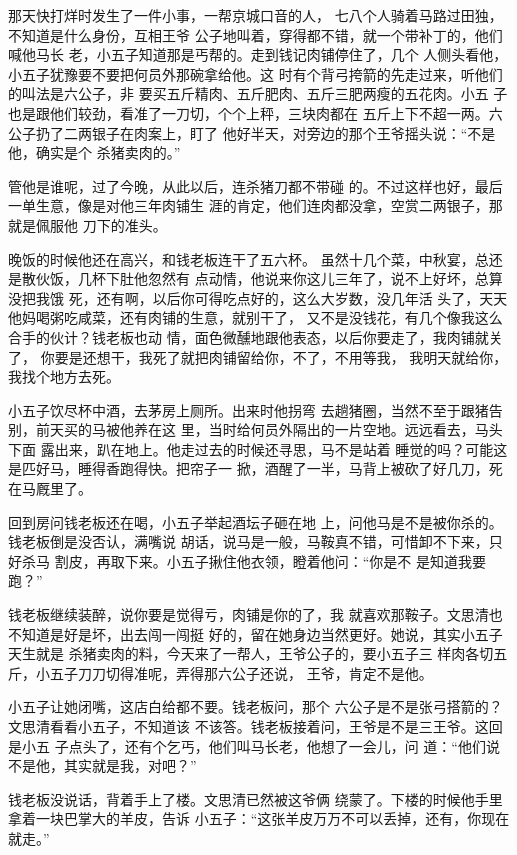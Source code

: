 那天快打烊时发生了一件小事，一帮京城口音的人，
七八个人骑着马路过田独，不知道是什么身份，互相王爷
公子地叫着，穿得都不错，就一个带补丁的，他们喊他马长
老，小五子知道那是丐帮的。走到钱记肉铺停住了，几个
人侧头看他，小五子犹豫要不要把何员外那碗拿给他。这
时有个背弓挎箭的先走过来，听他们的叫法是六公子，非
要买五斤精肉、五斤肥肉、五斤三肥两瘦的五花肉。小五
子也是跟他们较劲，看准了一刀切，个个上秤，三块肉都在
五斤上下不超一两。六公子扔了二两银子在肉案上，盯了
他好半天，对旁边的那个王爷摇头说：“不是他，确实是个
杀猪卖肉的。”

管他是谁呢，过了今晚，从此以后，连杀猪刀都不带碰
的。不过这样也好，最后一单生意，像是对他三年肉铺生
涯的肯定，他们连肉都没拿，空赏二两银子，那就是佩服他
刀下的准头。

晚饭的时候他还在高兴，和钱老板连干了五六杯。
虽然十几个菜，中秋宴，总还是散伙饭，几杯下肚他忽然有
点动情，他说来你这儿三年了，说不上好坏，总算没把我饿
死，还有啊，以后你可得吃点好的，这么大岁数，没几年活
头了，天天他妈喝粥吃咸菜，还有肉铺的生意，就别干了，
又不是没钱花，有几个像我这么合手的伙计？钱老板也动
情，面色微醺地跟他表态，以后你要走了，我肉铺就关了，
你要是还想干，我死了就把肉铺留给你，不了，不用等我，
我明天就给你，我找个地方去死。

小五子饮尽杯中酒，去茅房上厕所。出来时他拐弯
去趟猪圈，当然不至于跟猪告别，前天买的马被他养在这
里，当时给何员外隔出的一片空地。远远看去，马头下面
露出来，趴在地上。他走过去的时候还寻思，马不是站着
睡觉的吗？可能这是匹好马，睡得香跑得快。把帘子一
掀，酒醒了一半，马背上被砍了好几刀，死在马厩里了。

回到房问钱老板还在喝，小五子举起酒坛子砸在地
上，问他马是不是被你杀的。钱老板倒是没否认，满嘴说
胡话，说马是一般，马鞍真不错，可惜卸不下来，只好杀马
割皮，再取下来。小五子揪住他衣领，瞪着他问：“你是不
是知道我要跑？”

钱老板继续装醉，说你要是觉得亏，肉铺是你的了，我
就喜欢那鞍子。文思清也不知道是好是坏，出去闯一闯挺
好的，留在她身边当然更好。她说，其实小五子天生就是
杀猪卖肉的料，今天来了一帮人，王爷公子的，要小五子三
样肉各切五斤，小五子刀刀切得准呢，弄得那六公子还说，
王爷，肯定不是他。

小五子让她闭嘴，这店白给都不要。钱老板问，那个
六公子是不是张弓搭箭的？文思清看看小五子，不知道该
不该答。钱老板接着问，王爷是不是三王爷。这回是小五
子点头了，还有个乞丐，他们叫马长老，他想了一会儿，问
道：“他们说不是他，其实就是我，对吧？”

钱老板没说话，背着手上了楼。文思清已然被这爷俩
绕蒙了。下楼的时候他手里拿着一块巴掌大的羊皮，告诉
小五子：“这张羊皮万万不可以丢掉，还有，你现在就走。”

